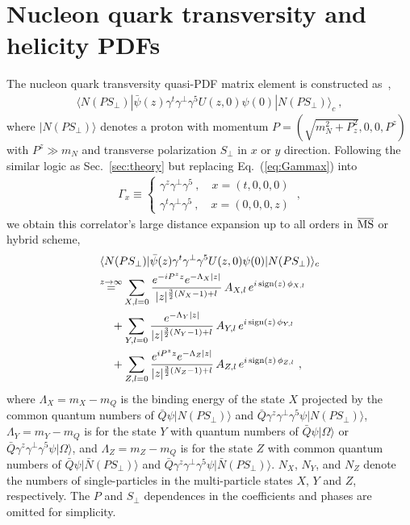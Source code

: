 \documentclass[a4paper,11pt]{article}
\begin{document}
\section{Nucleon quark transversity and helicity PDFs}\label{sec:PolPDF}
The nucleon quark transversity quasi-PDF matrix element is constructed as~\cite{Alexandrou:2021oih,LatticeParton:2022xsd},
\begin{align}
\langle N(P S_{\perp}) | \bar{\psi}(z) \gamma^t \gamma^{\perp} \gamma^5 U(z,0) \psi(0) | N(P S_{\perp}) \rangle_{c} \ ,
\end{align}
where $| N(P S_{\perp}) \rangle$ denotes a proton with momentum $P=\left(\sqrt{m_N^2+P_z^2},0,0,P^z\right)$ with $P^z \gg m_N$ and transverse polarization $S_{\perp}$ in $x$ or $y$ direction.  
Following the similar logic as Sec.~\ref{sec:theory} but replacing Eq.~(\ref{eq:Gammax}) into 
\begin{align}
\Gamma_x \equiv 
\begin{cases}
\gamma^z \gamma^{\perp} \gamma^5 \ , \quad x=(t,0,0,0) \\
\gamma^t \gamma^{\perp} \gamma^5 \ , \quad x=(0,0,0,z)
\end{cases} \ ,
\end{align}
we obtain this correlator's large distance expansion up to all orders in $\overline{\rm MS}$ or hybrid scheme,
\begin{align}\label{eq:qPDFPLzGen}
&\langle N(P S_{\perp}) | \bar{\psi}(z) \gamma^t \gamma^{\perp} \gamma^5 U(z,0) \psi(0) | N(P S_{\perp}) \rangle_{c}   \nonumber\\
&{\overset{z\rightarrow \infty}{=}}   
 \sum_{X,l=0} \frac{e^{-i P^z z} e^{-\Lambda_X |z| }}{|z|^{\frac{3}{2}(N_X-1)+l}} \, A_{X,l} \, e^{i \, {\rm sign}(z) \, \phi_{X,l}} \nonumber\\
&\quad + \sum_{Y,l=0} \frac{e^{-\Lambda_Y |z|}}{|z|^{\frac{3}{2}(N_Y-1)+l}} \, A_{Y,l} \, e^{i \, {\rm sign}(z) \, \phi_{Y,l}} \nonumber\\
&\quad + \sum_{Z,l=0} \frac{e^{i P^z z} e^{-\Lambda_Z |z|}}{|z|^{\frac{3}{2}(N_Z-1)+l}} \, A_{Z,l} \, e^{i \, {\rm sign}(z) \, \phi_{Z,l}} \ ,
\end{align}
where $\Lambda_X=m_X-m_Q$ is the binding energy of the state $X$ projected by the common quantum numbers of $\bar{Q} \psi | N(P S_{\perp}) \rangle$ and $\bar{Q} \gamma^z \gamma^{\perp} \gamma^5 \psi | N(P S_{\perp}) \rangle$, $\Lambda_Y=m_Y-m_Q$ is for the state $Y$ with quantum numbers of $\bar{Q}  \psi | \Omega \rangle$ or $\bar{Q} \gamma^z \gamma^{\perp} \gamma^5 \psi | \Omega \rangle$, and $\Lambda_Z=m_Z-m_Q$ is for the state $Z$ with common quantum numbers of $\bar{Q} \psi | \bar{N}(P S_{\perp}) \rangle$ and $\bar{Q} \gamma^z \gamma^{\perp} \gamma^5 \psi | \bar{N}(P S_{\perp}) \rangle$. $N_X$, $N_Y$, and $N_Z$ denote the numbers of single-particles in the multi-particle states $X$, $Y$ and $Z$, respectively. The $P$ and $S_{\perp}$ dependences in the coefficients and phases are omitted for simplicity. 
\end{document}
